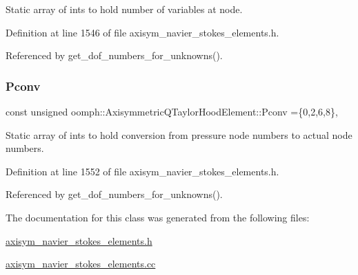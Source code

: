 Static array of ints to hold number of variables at node. 



Definition at line 1546 of file axisym\+\_\+navier\+\_\+stokes\+\_\+elements.\+h.



Referenced by get\+\_\+dof\+\_\+numbers\+\_\+for\+\_\+unknowns().

\mbox{\label{classoomph_1_1AxisymmetricQTaylorHoodElement_a40720e74e6b8ce8d803ee95d7a6ad119}} 
\subsubsection{\texorpdfstring{Pconv}{Pconv}}
{\footnotesize\ttfamily const unsigned oomph\+::\+Axisymmetric\+Q\+Taylor\+Hood\+Element\+::\+Pconv =\{0,2,6,8\}\hspace{0.3cm}{\ttfamily [static]}, {\ttfamily [protected]}}



Static array of ints to hold conversion from pressure node numbers to actual node numbers. 



Definition at line 1552 of file axisym\+\_\+navier\+\_\+stokes\+\_\+elements.\+h.



Referenced by get\+\_\+dof\+\_\+numbers\+\_\+for\+\_\+unknowns().



The documentation for this class was generated from the following files\+:\begin{DoxyCompactItemize}
\item 
\hyperlink{axisym__navier__stokes__elements_8h}{axisym\+\_\+navier\+\_\+stokes\+\_\+elements.\+h}\item 
\hyperlink{axisym__navier__stokes__elements_8cc}{axisym\+\_\+navier\+\_\+stokes\+\_\+elements.\+cc}\end{DoxyCompactItemize}
